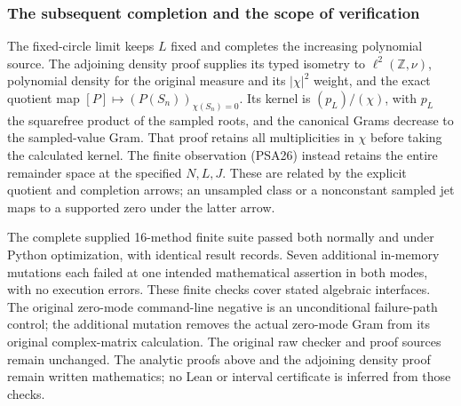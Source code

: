 \subsubsection{The subsequent completion and the scope of verification}

The fixed-circle limit keeps $L$ fixed and completes the increasing
polynomial source. The adjoining density proof supplies its typed
isometry to $\ell^2(\mathbb Z,\nu)$, polynomial density for the
original measure and its $|\chi|^2$ weight, and the exact quotient
map $[P]\mapsto(P(S_n))_{\chi(S_n)=0}$. Its kernel is
$(p_L)/(\chi)$, with $p_L$ the squarefree product of the sampled
roots, and the canonical Grams decrease to the sampled-value Gram.
That proof retains all multiplicities in $\chi$ before taking the
calculated kernel. The finite observation (PSA26) instead retains
the entire remainder space at the specified $N,L,J$. These are
related by the explicit quotient and completion arrows; an
unsampled class or a nonconstant sampled jet maps to a supported
zero under the latter arrow.

The complete supplied 16-method finite suite passed both normally
and under Python optimization, with identical result records.
Seven additional in-memory mutations each failed at one intended
mathematical assertion in both modes, with no execution errors.
These finite checks cover stated algebraic interfaces. The original
zero-mode command-line negative is an unconditional failure-path
control; the additional mutation removes the actual zero-mode Gram
from its original complex-matrix calculation. The original raw
checker and proof sources remain unchanged. The analytic proofs
above and the adjoining density proof remain written mathematics;
no Lean or interval certificate is inferred from those checks.


\endgroup
